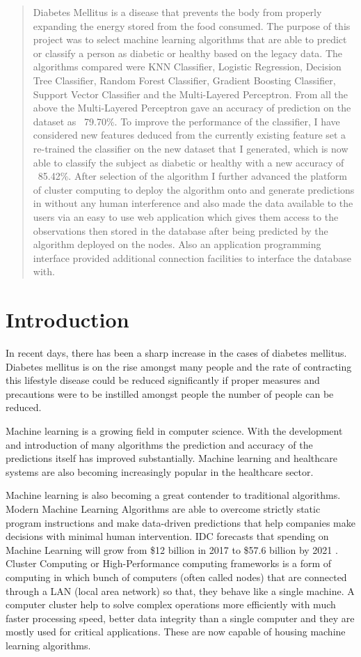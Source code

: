 \documentclass[12pt]{article}
\begin{document}
\begin{abstract}
Diabetes Mellitus is a disease that prevents the body from properly expanding the
energy stored from the food consumed. The purpose of this project was to select
machine learning algorithms that are able to predict or classify a person as diabetic
or healthy based on the legacy data. The algorithms compared were KNN
Classifier, Logistic Regression, Decision Tree Classifier, Random Forest
Classifier, Gradient Boosting Classifier, Support Vector Classifier and the
Multi-Layered Perceptron. From all the above the Multi-Layered Perceptron gave
an accuracy of prediction on the dataset as ~79.70\%. To improve the performance
of the classifier, I have considered new features deduced from the currently
existing feature set a re-trained the classifier on the new dataset that I generated,
which is now able to classify the subject as diabetic or healthy with a new accuracy
of ~85.42\%. After selection of the algorithm I further advanced the platform of cluster computing to
deploy the algorithm onto and generate predictions in without any human
interference​ and also made the data available
to the users via an easy to use web application which gives them access to the
observations then stored in the database after being predicted by the algorithm
deployed on the nodes. Also an application programming interface provided additional connection facilities to interface the database with.
\end{abstract}


\section{Introduction}
In recent days, there has been a sharp increase in the cases of diabetes mellitus. Diabetes mellitus is on the rise amongst many people and the rate of contracting this lifestyle disease could be reduced significantly if proper measures and precautions were to be instilled amongst people the number of people can be reduced.

Machine learning is a growing field in computer science. With the development and introduction of many algorithms the prediction and accuracy of the predictions itself has improved substantially. Machine learning and healthcare systems are also becoming increasingly popular in the healthcare sector.

Machine learning is also becoming a great contender to traditional algorithms. Modern Machine Learning Algorithms are able to overcome strictly static program instructions and make data-driven predictions that help companies make decisions with minimal human intervention. IDC forecasts that spending on Machine Learning will grow from \$12 billion in 2017 to \$57.6 billion by 2021 \cite{dzone}. Cluster Computing or High-Performance computing frameworks is a form of computing in which bunch of computers (often called nodes) that are connected through a LAN (local area network) so that, they behave like a single machine. A computer cluster help to solve complex operations more efficiently with much faster processing speed, better data integrity than a single computer and they are mostly used for critical applications. These are now capable of housing machine learning algorithms.
\end{document}
